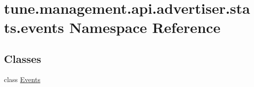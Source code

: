 \hypertarget{namespacetune_1_1management_1_1api_1_1advertiser_1_1stats_1_1events}{\section{tune.\-management.\-api.\-advertiser.\-stats.\-events Namespace Reference}
\label{namespacetune_1_1management_1_1api_1_1advertiser_1_1stats_1_1events}
}
\subsection*{Classes}
\begin{DoxyCompactItemize}
\item 
class \hyperlink{classtune_1_1management_1_1api_1_1advertiser_1_1stats_1_1events_1_1Events}{Events}
\end{DoxyCompactItemize}
